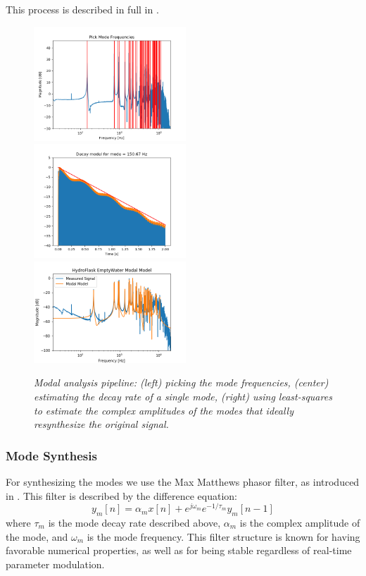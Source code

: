 \documentclass[twoside,a4paper]{article}
\begin{document}
This process is described in full in \cite{rau:das:canfielddafilou:carillon:2019}.
%
\begin{figure}
    \centering
    \includegraphics[width=2.25in]{Figures/ModePick_ex}
    \includegraphics[width=2.25in]{Figures/DecayFit_ex}
    \includegraphics[width=2.25in]{../Figures/HydroFlask/empty}
    \caption{\it{Modal analysis pipeline: (left) picking the mode frequencies,
    (center) estimating the decay rate of a single mode,
    (right) using least-squares to estimate the complex
    amplitudes of the modes that ideally resynthesize the
    original signal.}}
    \label{fig:modal_analysis}
\end{figure}
%
\subsubsection{Mode Synthesis} \label{sec:synthesis}
%
For synthesizing the modes we use the Max Matthews
phasor filter, as introduced in \cite{phasorfilter}.
This filter is described by the difference equation:
\begin{equation}
    y_m[n] = \alpha_m x[n] + e^{j\omega_m} e^{-1/\tau_m} y_m[n-1]
    \label{eq:phasor}
\end{equation}
%
where $\tau_m$ is the mode decay rate described above,
$\alpha_m$ is the complex amplitude of the mode, and $\omega_m$
is the mode frequency. This filter structure is known for
having favorable numerical properties, as well as for being
stable regardless of real-time parameter modulation.
\end{document}
